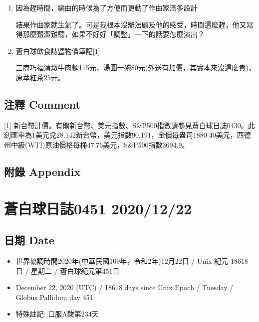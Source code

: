 \documentclass[a5paper, 11pt
]{book}
\providecommand{\tightlist}{%
  \setlength{\itemsep}{0pt}\setlength{\parskip}{0pt}}
\begin{document}
\begin{enumerate}
\def\labelenumi{\arabic{enumi}.}
\item
  因為趕時間，編曲的時候為了方便而更動了作曲家滿多設計

  結果作曲家就生氣了。可是我根本沒辦法顧及他的感受，時間這麼趕，他又寫得那麼艱澀難聽，如果不好好「調整」一下的話要怎麼演出？
\item
  蒼白球飲食誌暨物價筆記{[}1{]}

  三商巧福清燉牛肉麵115元，湯圓一碗80元(外送有加價，其實本來沒這麼貴)，原萃紅茶25元。
\end{enumerate}

\hypertarget{ux6ce8ux91cb-comment-20}{%
\subsection{注釋 Comment}\label{ux6ce8ux91cb-comment-20}}

{[}1{]}
新台幣計價。有關新台幣、美元指數、S\&P500指數請參見蒼白球日誌0430。此刻匯率為1美元兌28.142新台幣，美元指數90.191，金價每盎司1880.40美元，西德州中級(WTI)原油價格每桶47.76美元，S\&P500指數3694.9。

\hypertarget{ux9644ux9304-appendix-20}{%
\subsection{附錄 Appendix}\label{ux9644ux9304-appendix-20}}

\hypertarget{ux84bcux767dux7403ux65e5ux8a8c0451-20201222}{%
\section{蒼白球日誌0451
2020/12/22}\label{ux84bcux767dux7403ux65e5ux8a8c0451-20201222}}

\hypertarget{ux65e5ux671f-date-21}{%
\subsection{日期 Date}\label{ux65e5ux671f-date-21}}

\begin{itemize}
\tightlist
\item
  世界協調時間2020年(中華民國109年，令和2年)12月22日 / Unix 紀元 18618
  日 / 星期二 / 蒼白球紀元第451日
\item
  December 22, 2020 (UTC) / 18618 days since Unix Epoch / Tuesday /
  Globus Pallidum day 451
\item
  特殊註記: 口服A酸第234天
\end{itemize}
\end{document}
